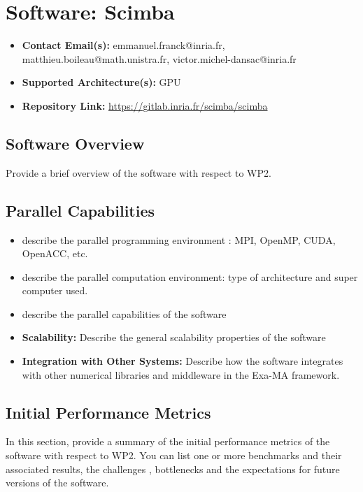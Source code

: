 \section{Software: Scimba}
\label{sec:WP2:Scimba:software}

\begin{itemize}
    \item \textbf{Contact Email(s):} emmanuel.franck@inria.fr, matthieu.boileau@math.unistra.fr, victor.michel-dansac@inria.fr
    \item \textbf{Supported Architecture(s):} GPU
    \item \textbf{Repository Link:} \href{https://gitlab.inria.fr/scimba/scimba}{https://gitlab.inria.fr/scimba/scimba}
\end{itemize}

\subsection{Software Overview}
\label{sec:WP2:Scimba:summary}

Provide a brief overview of the software with respect to WP2.

\subsection{Parallel Capabilities}
\label{sec:WP2:Scimba:performances}


\begin{itemize}
    \item describe the parallel programming  environment : MPI, OpenMP, CUDA, OpenACC, etc.
    \item describe the parallel computation environment: type of architecture and super computer used.
    \item describe the parallel capabilities of the software
    \item \textbf{Scalability:} Describe the general scalability properties of the software
    \item \textbf{Integration with Other Systems:} Describe how the software integrates with other numerical libraries and middleware in the Exa-MA framework.
\end{itemize}

\subsection{Initial Performance Metrics}
\label{sec:WP2:Scimba:metrics}

In this section, provide a summary of the initial performance metrics of the software with respect to WP2.
You can list one or more benchmarks and their associated results, the challenges , bottlenecks and the expectations for future versions of the software.



